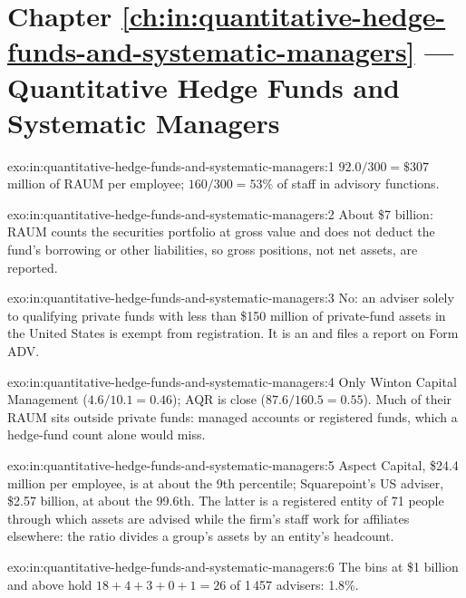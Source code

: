 \section*{Chapter \ref{ch:in:quantitative-hedge-funds-and-systematic-managers} --- Quantitative Hedge Funds and Systematic Managers}

\begin{solution}{exo:in:quantitative-hedge-funds-and-systematic-managers:1}
$92.0/300=\$307$ million of RAUM per employee; $160/300=53\%$ of staff in advisory functions.
\end{solution}

\begin{solution}{exo:in:quantitative-hedge-funds-and-systematic-managers:2}
About \$7 billion: RAUM counts the securities portfolio at gross value and does not deduct the fund's borrowing or
other liabilities, so gross positions, not net assets, are reported.
\end{solution}

\begin{solution}{exo:in:quantitative-hedge-funds-and-systematic-managers:3}
No: an adviser solely to qualifying private funds with less than \$150 million of private-fund assets in the United
States is exempt from registration. It is an  and files a report on Form ADV.
\end{solution}

\begin{solution}{exo:in:quantitative-hedge-funds-and-systematic-managers:4}
Only Winton Capital Management ($4.6/10.1=0.46$); AQR is close ($87.6/160.5=0.55$). Much of their RAUM sits outside
private funds: managed accounts or registered funds, which a hedge-fund count alone would miss.
\end{solution}

\begin{solution}{exo:in:quantitative-hedge-funds-and-systematic-managers:5}
Aspect Capital, \$24.4 million per employee, is at about the 9th percentile; Squarepoint's US adviser, \$2.57 billion, at
about the 99.6th. The latter is a registered entity of 71 people through which assets are advised while the firm's
staff work for affiliates elsewhere: the ratio divides a group's assets by an entity's headcount.
\end{solution}

\begin{solution}{exo:in:quantitative-hedge-funds-and-systematic-managers:6}
The bins at \$1 billion and above hold $18+4+3+0+1=26$ of 1\,457 advisers: 1.8\%.
\end{solution}


